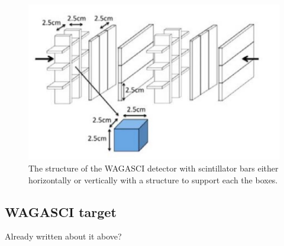 \begin{figure}[h!]
\centering
\includegraphics[width=\textwidth]{figures/structure.jpeg}
\caption{The structure of the WAGASCI detector with scintillator bars either horizontally or vertically with a structure to support each the boxes.}
\label{fig:StrucWAGASCI}
\end{figure}

\subsection{WAGASCI target}
Already written about it above?

